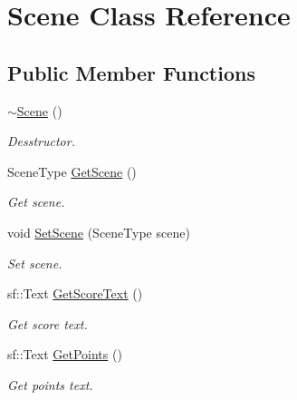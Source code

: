 \hypertarget{class_scene}{}\section{Scene Class Reference}
\label{class_scene}
\subsection*{Public Member Functions}
\begin{DoxyCompactItemize}
\item 
\mbox{\label{class_scene_a3b8cec2e32546713915f8c6303c951f1}} 
\hyperlink{class_scene_a3b8cec2e32546713915f8c6303c951f1}{$\sim$\+Scene} ()
\begin{DoxyCompactList}\small\item\em Desstructor. \end{DoxyCompactList}\item 
\mbox{\label{class_scene_a442dd94af5bd4ee544c929832f4eed6a}} 
Scene\+Type \hyperlink{class_scene_a442dd94af5bd4ee544c929832f4eed6a}{Get\+Scene} ()
\begin{DoxyCompactList}\small\item\em Get scene. \end{DoxyCompactList}\item 
\mbox{\label{class_scene_a2c78bfa591688e99f314a5f193c6c4f0}} 
void \hyperlink{class_scene_a2c78bfa591688e99f314a5f193c6c4f0}{Set\+Scene} (Scene\+Type scene)
\begin{DoxyCompactList}\small\item\em Set scene. \end{DoxyCompactList}\item 
\mbox{\label{class_scene_ae0de17df8ca6fd97d47824be1f9e7634}} 
sf\+::\+Text \hyperlink{class_scene_ae0de17df8ca6fd97d47824be1f9e7634}{Get\+Score\+Text} ()
\begin{DoxyCompactList}\small\item\em Get score text. \end{DoxyCompactList}\item 
\mbox{\label{class_scene_a59803cc75dca996bd66d6acdaa99df76}} 
sf\+::\+Text \hyperlink{class_scene_a59803cc75dca996bd66d6acdaa99df76}{Get\+Points} ()
\begin{DoxyCompactList}\small\item\em Get points text. \end{DoxyCompactList}\item 

\end{DoxyCompactItemize}
